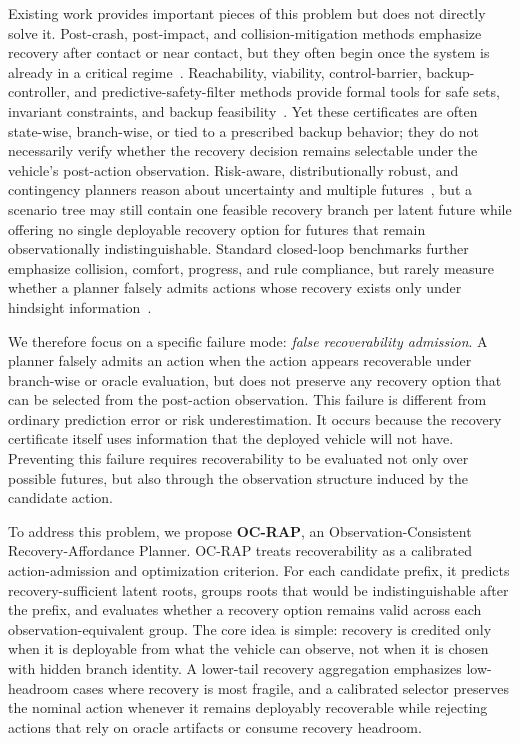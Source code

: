 \documentclass[conference]{IEEEtran}
\begin{document}
Existing work provides important pieces of this problem but does not directly solve it.  Post-crash, post-impact, and collision-mitigation methods emphasize recovery after contact or near contact, but they often begin once the system is already in a critical regime~\cite{li2022vehicle,bosia2024real,wang2023integrated,parseh2023motion,wang2024post}.  Reachability, viability, control-barrier, backup-controller, and predictive-safety-filter methods provide formal tools for safe sets, invariant constraints, and backup feasibility~\cite{bansal2017hamilton,bansal2021deepreach,ames2019control,wabersich2021predictive,tearle2021predictive,kim2026backup}.  Yet these certificates are often state-wise, branch-wise, or tied to a prescribed backup behavior; they do not necessarily verify whether the recovery decision remains selectable under the vehicle's post-action observation.  Risk-aware, distributionally robust, and contingency planners reason about uncertainty and multiple futures~\cite{uryasev2000conditional,hakobyan2021wasserstein,safaoui2024distributionally,batkovic2020robust,nair2024predictive,li2023marc,mustafa2024racp}, but a scenario tree may still contain one feasible recovery branch per latent future while offering no single deployable recovery option for futures that remain observationally indistinguishable.  Standard closed-loop benchmarks further emphasize collision, comfort, progress, and rule compliance, but rarely measure whether a planner falsely admits actions whose recovery exists only under hindsight information~\cite{dosovitskiy2017carla,caesar2021nuplan,li2022metadrive,ettinger2021large,wilson2023argoverse,zhan2019interaction,caesar2020nuscenes,ding2025understanding,lu2025risk,hu2025survey}.

We therefore focus on a specific failure mode: \emph{false recoverability admission}.  A planner falsely admits an action when the action appears recoverable under branch-wise or oracle evaluation, but does not preserve any recovery option that can be selected from the post-action observation.  This failure is different from ordinary prediction error or risk underestimation.  It occurs because the recovery certificate itself uses information that the deployed vehicle will not have.  Preventing this failure requires recoverability to be evaluated not only over possible futures, but also through the observation structure induced by the candidate action.

To address this problem, we propose \textbf{OC-RAP}, an Observation-Consistent Recovery-Affordance Planner.  OC-RAP treats recoverability as a calibrated action-admission and optimization criterion.  For each candidate prefix, it predicts recovery-sufficient latent roots, groups roots that would be indistinguishable after the prefix, and evaluates whether a recovery option remains valid across each observation-equivalent group.  The core idea is simple: recovery is credited only when it is deployable from what the vehicle can observe, not when it is chosen with hidden branch identity.  A lower-tail recovery aggregation emphasizes low-headroom cases where recovery is most fragile, and a calibrated selector preserves the nominal action whenever it remains deployably recoverable while rejecting actions that rely on oracle artifacts or consume recovery headroom.
\end{document}
